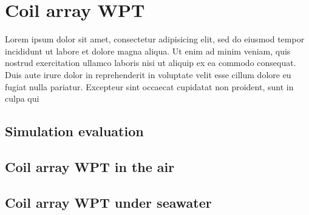 \chapter{Coil array WPT}
 Lorem ipsum dolor sit amet, consectetur adipisicing elit,
 sed do eiusmod tempor incididunt ut labore et dolore magna aliqua.
 Ut enim ad minim veniam, quis nostrud exercitation ullamco laboris nisi ut aliquip ex ea commodo consequat.
 Duis aute irure dolor in reprehenderit in voluptate velit esse cillum dolore eu fugiat nulla pariatur.
 Excepteur sint occaecat cupidatat non proident, sunt in culpa qui
 \section{Simulation evaluation}
 
 \section{Coil array WPT in the air}

 \section{Coil array WPT under seawater}